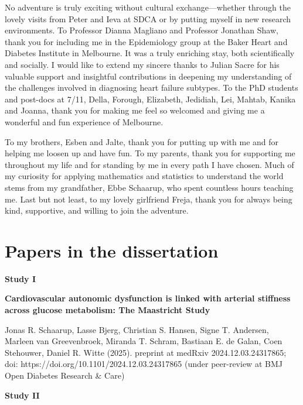 \documentclass[
  letterpaper,
  headsepline=true,
  open=any]{scrbook}
\begin{document}
No adventure is truly exciting without cultural exchange---whether
through the lovely visits from Peter and Ieva at SDCA or by putting
myself in new research environments. To Professor Dianna Magliano and
Professor Jonathan Shaw, thank you for including me in the Epidemiology
group at the Baker Heart and Diabetes Institute in Melbourne. It was a
truly enriching stay, both scientifically and socially. I would like to
extend my sincere thanks to Julian Sacre for his valuable support and
insightful contributions in deepening my understanding of the challenges
involved in diagnosing heart failure subtypes. To the PhD students and
post-docs at 7/11, Della, Forough, Elizabeth, Jedidiah, Lei, Mahtab,
Kanika and Joanna, thank you for making me feel so welcomed and giving
me a wonderful and fun experience of Melbourne.

To my brothers, Esben and Jalte, thank you for putting up with me and
for helping me loosen up and have fun. To my parents, thank you for
supporting me throughout my life and for standing by me in every path I
have chosen. Much of my curiosity for applying mathematics and
statistics to understand the world stems from my grandfather, Ebbe
Schaarup, who spent countless hours teaching me. Last but not least, to
my lovely girlfriend Freja, thank you for always being kind, supportive,
and willing to join the adventure.


\hypertarget{sec-linked-papers}{%
\chapter*{Papers in the dissertation}\label{sec-linked-papers}}


\textbf{Study I}

\textbf{Cardiovascular autonomic dysfunction is linked with arterial
stiffness across glucose metabolism: The Maastricht Study}

Jonas R. Schaarup, Lasse Bjerg, Christian S. Hansen, Signe T. Andersen,
Marleen van Greevenbroek, Miranda T. Schram, Bastiaan E. de Galan, Coen
Stehouwer, Daniel R. Witte (2025). preprint at medRxiv
2024.12.03.24317865; doi: https://doi.org/10.1101/2024.12.03.24317865
(under peer-review at BMJ Open Diabetes Research \& Care)

\textbf{Study II}
\end{document}
